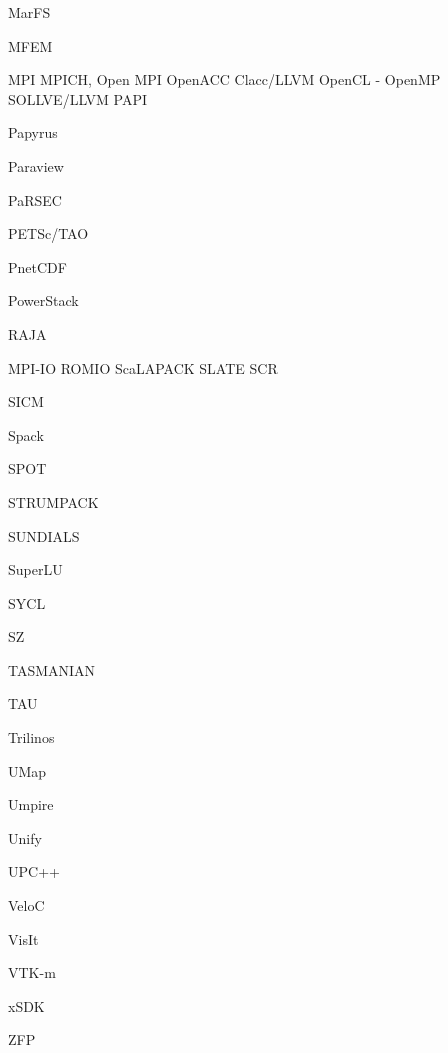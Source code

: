 MarFS

MFEM

MPI
MPICH, Open MPI
OpenACC
Clacc/LLVM
OpenCL
-
OpenMP
SOLLVE/LLVM
PAPI

Papyrus

Paraview

PaRSEC

PETSc/TAO

PnetCDF

PowerStack

RAJA

MPI-IO
ROMIO
ScaLAPACK
SLATE
SCR

SICM

Spack

SPOT

STRUMPACK

SUNDIALS

SuperLU

SYCL

SZ

TASMANIAN

TAU

Trilinos

UMap

Umpire

Unify

UPC++

VeloC

VisIt

VTK-m

xSDK

ZFP


